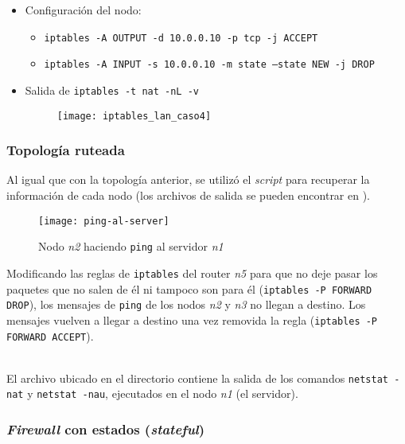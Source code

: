 \begin{itemize}
    \item Configuración del nodo:
    \begin{itemize}
        \item \texttt{iptables -A OUTPUT -d 10.0.0.10 -p tcp -j ACCEPT} 
        \item \texttt{iptables -A INPUT -s 10.0.0.10 -m state --state NEW -j DROP} 
    \end{itemize}
    \item Salida de \texttt{iptables -t nat -nL -v} 
    \begin{figure}[H]
        \centering
        \texttt{[image: iptables\_lan\_caso4]}
    \end{figure}
\end{itemize}

\subsubsection{Topología ruteada}

Al igual que con la topología anterior, se utilizó el \emph{script}  para recuperar la información de cada nodo (los archivos de salida se pueden encontrar en ).

\begin{figure}[H]
    \centering
    \texttt{[image: ping-al-server]}
    \caption{Nodo \emph{n2} haciendo \texttt{ping} al servidor \emph{n1}}
\end{figure}

Modificando las reglas de \texttt{iptables} del router \emph{n5} para que no deje pasar los paquetes que no salen de él ni tampoco son para él (\texttt{iptables -P FORWARD DROP}), los mensajes de \texttt{ping} de los nodos \emph{n2} y \emph{n3} no llegan a destino. Los mensajes vuelven a llegar a destino una vez removida la regla (\texttt{iptables -P FORWARD ACCEPT}).

~\\

El archivo  ubicado en el directorio  contiene la salida de los comandos \texttt{netstat -nat} y \texttt{netstat -nau}, ejecutados en el nodo \emph{n1} (el servidor). 

\subsubsection*{\emph{Firewall} con estados (\emph{stateful})}

